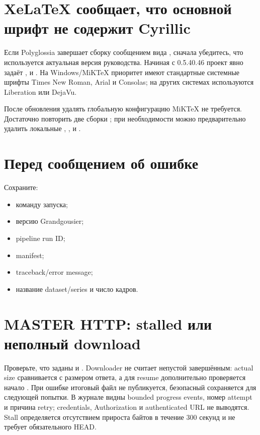 \section{XeLaTeX сообщает, что основной шрифт не содержит Cyrillic}

Если Polyglossia завершает сборку сообщением вида
, сначала убедитесь, что используется
актуальная версия руководства. Начиная с 0.5.40.46 проект явно задаёт
\cli{\\cyrillicfont}, \cli{\\cyrillicfontsf} и \cli{\\cyrillicfonttt}.
На Windows/MiKTeX приоритет имеют стандартные системные шрифты Times New Roman,
Arial и Consolas; на других системах используются Liberation или DejaVu.

После обновления удалять глобальную конфигурацию MiKTeX не требуется. Достаточно
повторить две сборки ; при необходимости можно предварительно удалить
локальные , ,  и .

\section{Перед сообщением об ошибке}

Сохраните:

\begin{itemize}
  \item команду запуска;
  \item версию Grandgousier;
  \item pipeline run ID;
  \item manifest;
  \item traceback/error message;
  \item название dataset/series и число кадров.
\end{itemize}

\section{MASTER HTTP: stalled или неполный download}

Проверьте, что заданы  и . Downloader не считает непустой  завершённым: actual size сравнивается с размером ответа, а для resume дополнительно проверяется начало . При ошибке итоговый файл не публикуется, безопасный  сохраняется для следующей попытки. В журнале видны bounded progress events, номер attempt и причина retry; credentials, Authorization и authenticated URL не выводятся. Stall определяется отсутствием прироста байтов в течение 300 секунд и не требует обязательного HEAD.


